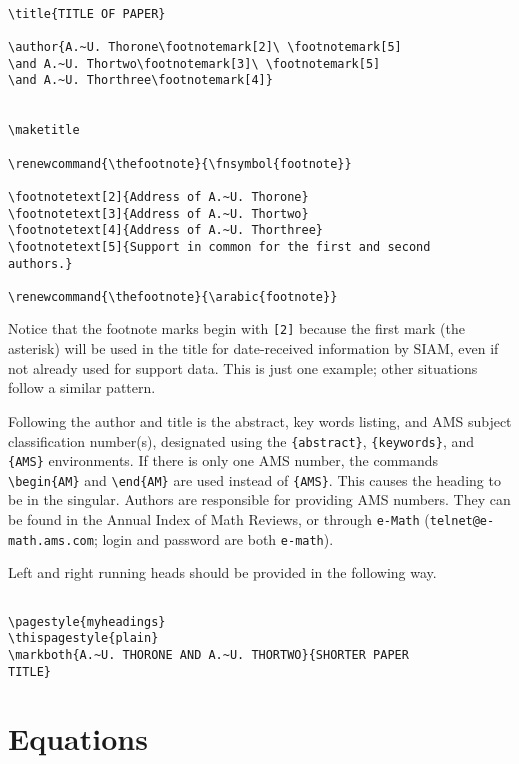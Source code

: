 \begin{verbatim}

\title{TITLE OF PAPER}

\author{A.~U. Thorone\footnotemark[2]\ \footnotemark[5]
\and A.~U. Thortwo\footnotemark[3]\ \footnotemark[5]
\and A.~U. Thorthree\footnotemark[4]}


\maketitle

\renewcommand{\thefootnote}{\fnsymbol{footnote}}

\footnotetext[2]{Address of A.~U. Thorone}
\footnotetext[3]{Address of A.~U. Thortwo}
\footnotetext[4]{Address of A.~U. Thorthree}
\footnotetext[5]{Support in common for the first and second
authors.}

\renewcommand{\thefootnote}{\arabic{footnote}}

\end{verbatim}

Notice that the footnote marks begin with {\tt [2]}
because the first mark (the asterisk) will be used in the
title for date-received information by SIAM, even if not
already used for support data. This is just one example;
other situations follow a similar pattern.

Following the author and title is the abstract, key words
listing, and AMS subject classification number(s),
designated using the \verb|{abstract}|, \verb|{keywords}|,
and \verb|{AMS}| environments. If
there is only one AMS number, the commands
\verb|\begin{AM}| and \verb|\end{AM}| are used
instead of \verb|{AMS}|. This causes the heading to be
in the singular. Authors are responsible for providing AMS numbers.
They can be found in the Annual Index of Math Reviews, or
through {\tt e-Math} ({\tt telnet@e-math.ams.com}; login
and password are both {\tt e-math}).   

Left and right running heads should be provided in the
following way.

\begin{verbatim}

\pagestyle{myheadings}
\thispagestyle{plain}
\markboth{A.~U. THORONE AND A.~U. THORTWO}{SHORTER PAPER
TITLE} 

\end{verbatim}

\section{Equations}

